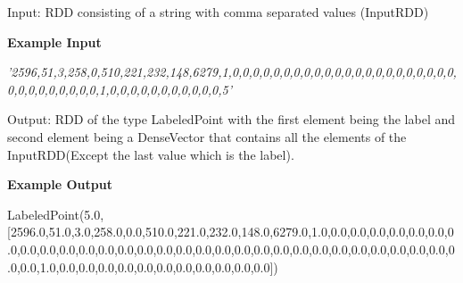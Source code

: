 \documentclass[11pt]{article}
\newenvironment{Shaded}{}{}
\newcommand{\FloatTok}[1]{\textcolor[rgb]{0.25,0.63,0.44}{{#1}}}
\newcommand{\CommentTok}[1]{\textcolor[rgb]{0.38,0.63,0.69}{\textit{{#1}}}}
\newcommand{\NormalTok}[1]{{#1}}
\begin{document}
Input: RDD consisting of a string with comma separated values (InputRDD)

\textbf{Example Input}

\begin{Shaded}
\begin{Highlighting}[]
\CommentTok{'2596,51,3,258,0,510,221,232,148,6279,1,0,0,0,0,0,0,0,0,0,0,0,0,0,0,0,0,0,0,0,0,0,0,0,0,0,0,0,0,0,0,0,1,0,0,0,0,0,0,0,0,0,0,0,5'}
\end{Highlighting}
\end{Shaded}

Output: RDD of the type LabeledPoint with the first element being the
label and second element being a DenseVector that contains all the
elements of the InputRDD(Except the last value which is the label).

\textbf{Example Output}

\begin{Shaded}
\begin{Highlighting}[]
\NormalTok{LabeledPoint(}\FloatTok{5.0}\NormalTok{, [}\FloatTok{2596.0}\NormalTok{,}\FloatTok{51.0}\NormalTok{,}\FloatTok{3.0}\NormalTok{,}\FloatTok{258.0}\NormalTok{,}\FloatTok{0.0}\NormalTok{,}\FloatTok{510.0}\NormalTok{,}\FloatTok{221.0}\NormalTok{,}\FloatTok{232.0}\NormalTok{,}\FloatTok{148.0}\NormalTok{,}\FloatTok{6279.0}\NormalTok{,}\FloatTok{1.0}\NormalTok{,}\FloatTok{0.0}\NormalTok{,}\FloatTok{0.0}\NormalTok{,}\FloatTok{0.0}\NormalTok{,}\FloatTok{0.0}\NormalTok{,}\FloatTok{0.0}\NormalTok{,}\FloatTok{0.0}\NormalTok{,}\FloatTok{0.0}\NormalTok{,}\FloatTok{0.0}\NormalTok{,}\FloatTok{0.0}\NormalTok{,}\FloatTok{0.0}\NormalTok{,}\FloatTok{0.0}\NormalTok{,}\FloatTok{0.0}\NormalTok{,}\FloatTok{0.0}\NormalTok{,}\FloatTok{0.0}\NormalTok{,}\FloatTok{0.0}\NormalTok{,}\FloatTok{0.0}\NormalTok{,}\FloatTok{0.0}\NormalTok{,}\FloatTok{0.0}\NormalTok{,}\FloatTok{0.0}\NormalTok{,}\FloatTok{0.0}\NormalTok{,}\FloatTok{0.0}\NormalTok{,}\FloatTok{0.0}\NormalTok{,}\FloatTok{0.0}\NormalTok{,}\FloatTok{0.0}\NormalTok{,}\FloatTok{0.0}\NormalTok{,}\FloatTok{0.0}\NormalTok{,}\FloatTok{0.0}\NormalTok{,}\FloatTok{0.0}\NormalTok{,}\FloatTok{0.0}\NormalTok{,}\FloatTok{0.0}\NormalTok{,}\FloatTok{0.0}\NormalTok{,}\FloatTok{1.0}\NormalTok{,}\FloatTok{0.0}\NormalTok{,}\FloatTok{0.0}\NormalTok{,}\FloatTok{0.0}\NormalTok{,}\FloatTok{0.0}\NormalTok{,}\FloatTok{0.0}\NormalTok{,}\FloatTok{0.0}\NormalTok{,}\FloatTok{0.0}\NormalTok{,}\FloatTok{0.0}\NormalTok{,}\FloatTok{0.0}\NormalTok{,}\FloatTok{0.0}\NormalTok{,}\FloatTok{0.0}\NormalTok{])}
\end{Highlighting}
\end{Shaded}
\end{document}
